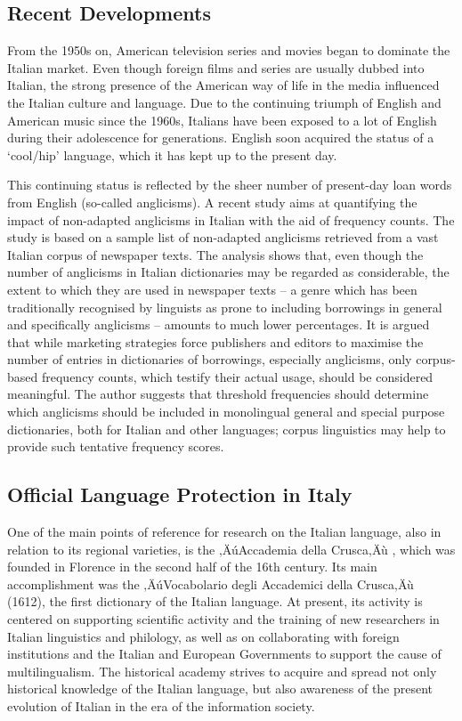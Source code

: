 \begin{multicols}{2}
\subsection{Recent Developments}

From the 1950s on, American television series and movies began to dominate the
Italian market. Even though foreign films and series are usually dubbed into
Italian, the strong presence of the American way of life in the media
influenced the Italian culture and language. Due to the continuing triumph of
English and American music since the 1960s, Italians have been exposed to a
lot of English during their adolescence for generations. English soon acquired
the status of a `cool/hip' language, which it has kept up to the present
day.

This continuing status is reflected by the sheer number of present-day loan
words from English (so-called anglicisms). A recent study \cite{Fischer} aims
at quantifying the impact of non-adapted anglicisms in Italian with the aid of
frequency counts. The study is based on a sample list of non-adapted anglicisms
retrieved from a vast Italian corpus of newspaper texts. The analysis shows
that, even though the number of anglicisms in Italian dictionaries may be
regarded as considerable, the extent to which they are used in newspaper texts
-- a genre which has been traditionally recognised by linguists as prone to
including borrowings in general and specifically anglicisms -- amounts to much
lower percentages. It is argued that while marketing strategies force
publishers and editors to maximise the number of entries in dictionaries of
borrowings, especially anglicisms, only corpus-based frequency counts, which
testify their actual usage, should be considered meaningful. The author
suggests that threshold frequencies should determine which anglicisms should
be included in monolingual general and special purpose dictionaries, both for
Italian and other languages; corpus linguistics may help to provide such
tentative frequency scores.

\subsection{Official Language Protection in Italy}

One of the main points of reference for research on the Italian
language, also in relation to its regional varieties, is the
‚ÄúAccademia della Crusca‚Äù \cite{Crusca}, which was founded in Florence
in the second half of the 16th century. Its main accomplishment was
the ‚ÄúVocabolario degli Accademici della Crusca‚Äù (1612), the first
dictionary of the Italian language. At present, its activity is
centered on supporting scientific activity and the training of new
researchers in Italian linguistics and philology, as well as on
collaborating with foreign institutions and the Italian and European
Governments to support the cause of multilingualism. The historical
academy strives to acquire and spread not only historical knowledge of
the Italian language, but also awareness of the present evolution of
Italian in the era of the information society.


\end{multicols}
